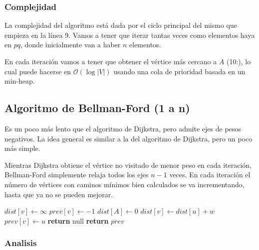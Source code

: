 \subsubsection*{Complejidad}

La complejidad del algoritmo est\'a dada por el ciclo principal del mismo que empieza en la l\'inea 9. Vamos a tener que iterar tantas veces como elementos haya en $pq$, donde inicialmente van a haber $n$ elementos.

En cada iteraci\'on vamos a tener que obtener el v\'ertice m\'as cercano a $A$ (10:), lo cual puede hacerse en $\mathcal{O}(\log{} |V|)$ usando una cola de prioridad basada en un min-heap.


\newpage
\subsection{Algoritmo de Bellman-Ford (1 a n)}

Es un poco m\'as lento que el algoritmo de Dijkstra, pero admite ejes de pesos negativos. La idea general es similar a la del algoritmo de Dijkstra, pero un poco m\'as simple. 

Mientras Dijkstra obtiene el v\'ertice no visitado de menor peso en cada iteraci\'on, Bellman-Ford simplemente relaja todos los ejes $n-1$ veces. En cada iteraci\'on el n\'umero de v\'ertices con caminos m\'inimos bien calculados se va incrementando, hasta que ya no se pueden mejorar.

\begin{algorithm}
\begin{algorithmic}[1]
    \State $dist[v] \gets \infty$
    \State $prev[v] \gets -1$
  \EndFor
  \State $dist[A] \gets 0$
            \State $dist[v] \gets dist[u] + w$
            \State $prev[v] \gets u$
        \EndIf
    \EndFor
  \EndFor
    
        \State \textbf{return} null
    \EndIf
  \EndFor
  \State \textbf{return} $prev$
\EndFunction
\end{algorithmic}
\end{algorithm}

\subsubsection*{Analisis}

